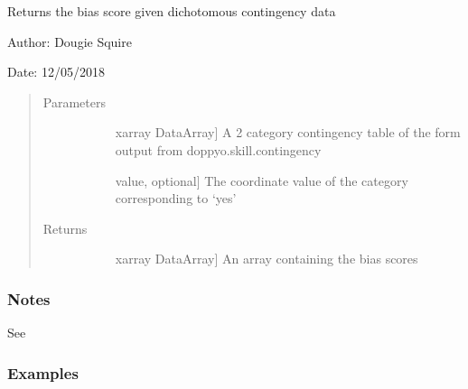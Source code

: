 \documentclass[letterpaper,10pt,english]{sphinxmanual}
\begin{document}

\begin{fulllineitems}
\label{\detokenize{skill_doc:skill.bias_score}}
Returns the bias score given dichotomous contingency data

\begin{DUlineblock}{0em}
\item[] Author: Dougie Squire
\item[] Date: 12/05/2018
\end{DUlineblock}
\begin{quote}\begin{description}
\item[{Parameters}] \leavevmode\begin{description}
\item[{}] \leavevmode{[}xarray DataArray{]}
A 2 category contingency table of the form output from doppyo.skill.contingency

\item[{}] \leavevmode{[}value, optional{]}
The coordinate value of the category corresponding to ‘yes’

\end{description}

\item[{Returns}] \leavevmode\begin{description}
\item[{}] \leavevmode{[}xarray DataArray{]}
An array containing the bias scores

\end{description}

\end{description}\end{quote}
\subsubsection*{Notes}

See 
\subsubsection*{Examples}


\end{fulllineitems}
\end{document}
